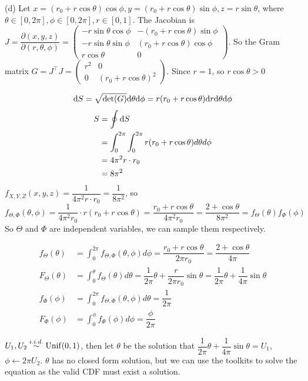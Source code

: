 \begin{homeworkProblem}
(d) Let $x=(r_0+r\cos\theta)\cos\phi, y=(r_0+r\cos\theta)\sin\phi, z=r\sin\theta$, where $\theta\in [0, 2\pi], \phi\in [0, 2\pi], r\in [0, 1]$. The Jacobian is $J=\dfrac{\partial(x, y, z)}{\partial(r, \theta, \phi)}=\begin{pmatrix}
-r\sin\theta\cos\phi & -(r_0+r\cos\theta)\sin\phi \\
-r\sin\theta\sin\phi & (r_0+r\cos\theta)\cos\phi \\
r\cos\theta & 0
\end{pmatrix}$.
So the Gram matrix $G=J^{\top}J=\begin{pmatrix}
r^2 & 0 \\
0 & (r_0+r\cos\theta)^2
\end{pmatrix}$.
Since $r=1$, so $r\cos\theta>0$

$$\mathrm{d}S = \sqrt{\det(G)}\mathrm{d}\theta\mathrm{d}\phi = r(r_0+r\cos\theta)\mathrm{d}r\mathrm{d}\theta\mathrm{d}\phi$$
\begin{align*}
S &= \oint \mathrm{d}S \\
&= \int_{0}^{2\pi}\int_{0}^{2\pi}r(r_0+r\cos\theta)d\theta d\phi \\
&= 4\pi^2r\cdot r_0 \\
&= 8\pi^2
\end{align*}
$f_{X,Y,Z}(x,y,z)=\dfrac{1}{4\pi^2r\cdot r_0}=\dfrac{1}{8\pi^2}$, so
$$f_{\Theta, \Phi}(\theta,\phi)=\dfrac{1}{4\pi^2r_0}\cdot r(r_0+r\cos\theta)=\dfrac{r_0+r\cos\theta}{4\pi^2r_0} = \dfrac{2+\cos\theta}{8\pi^2}=f_{\Theta}(\theta)f_{\Phi}(\phi)$$
So $\Theta$ and $\Phi$ are independent variables, we can sample them respectively.

\begin{align*}
f_{\Theta}(\theta) &= \int_{0}^{2\pi}f_{\Theta, \Phi}(\theta,\phi)d\phi = \dfrac{r_0+r\cos\theta}{2\pi r_0} = \dfrac{2+\cos\theta}{4\pi} \\
F_{\Theta}(\theta) &= \int_{0}^{\theta}f_{\Theta}(\theta)d\theta = \dfrac{1}{2\pi}\theta + \dfrac{r}{2\pi r_0}\sin\theta = \dfrac{1}{2\pi}\theta + \dfrac{1}{4\pi}\sin\theta \\
f_{\Phi}(\phi) &= \int_{0}^{2\pi}f_{\Theta, \Phi}(\theta,\phi)d\theta = \dfrac{1}{2\pi} \\
F_{\Phi}(\phi) &= \int_{0}^{\phi}f_{\Phi}(\phi)d\phi = \dfrac{\phi}{2\pi}
\end{align*}

$U_1, U_2\stackrel{i.i.d.}{\sim} \operatorname{Unif}(0, 1)$, then let
$\theta$ be the solution that $\dfrac{1}{2\pi}\theta + \dfrac{1}{4\pi}\sin\theta=U_1$, $\phi\leftarrow 2\pi U_2$. $\theta$ has no closed form solution, but we can use the toolkits to solve the equation as the valid CDF must exist a solution.


\end{homeworkProblem}
